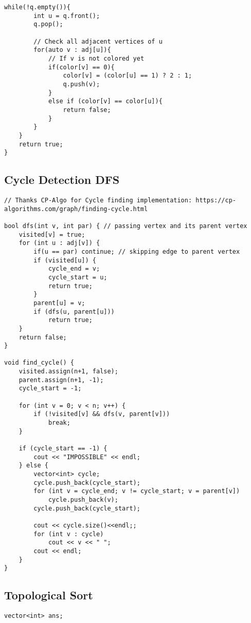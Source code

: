 \documentclass[10pt]{article}
\begin{document}
\begin{multicols*}{2}
\begin{lstlisting}[style=compactcpp]
    while(!q.empty()){
        int u = q.front();
        q.pop();
 
        // Check all adjacent vertices of u
        for(auto v : adj[u]){
            // If v is not colored yet
            if(color[v] == 0){
                color[v] = (color[u] == 1) ? 2 : 1;
                q.push(v);
            }
            else if (color[v] == color[u]){
                return false;
            }
        }
    }
    return true;
}

\end{lstlisting}

\subsection{Cycle Detection DFS}

\begin{lstlisting}[style=compactcpp]
// Thanks CP-Algo for Cycle finding implementation: https://cp-algorithms.com/graph/finding-cycle.html
 
bool dfs(int v, int par) { // passing vertex and its parent vertex
    visited[v] = true;
    for (int u : adj[v]) {
        if(u == par) continue; // skipping edge to parent vertex
        if (visited[u]) {
            cycle_end = v;
            cycle_start = u;
            return true;
        }
        parent[u] = v;
        if (dfs(u, parent[u]))
            return true;
    }
    return false;
}

void find_cycle() {
    visited.assign(n+1, false);
    parent.assign(n+1, -1);
    cycle_start = -1;
 
    for (int v = 0; v < n; v++) {
        if (!visited[v] && dfs(v, parent[v]))
            break;
    }
 
    if (cycle_start == -1) {
        cout << "IMPOSSIBLE" << endl;
    } else {
        vector<int> cycle;
        cycle.push_back(cycle_start);
        for (int v = cycle_end; v != cycle_start; v = parent[v])
            cycle.push_back(v);
        cycle.push_back(cycle_start);
 
        cout << cycle.size()<<endl;;
        for (int v : cycle)
            cout << v << " ";
        cout << endl;
    }
}
\end{lstlisting}

\subsection{Topological Sort}

\begin{lstlisting}[style=compactcpp]
vector<int> ans;
 

\end{lstlisting}
\end{multicols*}
\end{document}
